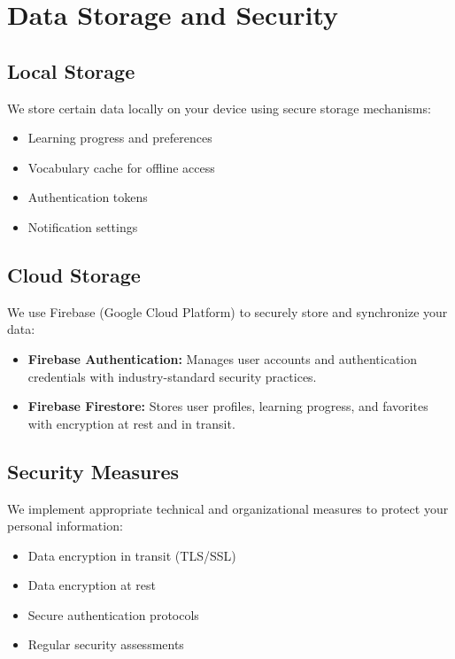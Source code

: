\documentclass[11pt,a4paper]{article}
\begin{document}
\section{Data Storage and Security}

\subsection{Local Storage}

We store certain data locally on your device using secure storage mechanisms:

\begin{itemize}[leftmargin=2em]
    \item Learning progress and preferences
    \item Vocabulary cache for offline access
    \item Authentication tokens
    \item Notification settings
\end{itemize}

\subsection{Cloud Storage}

We use Firebase (Google Cloud Platform) to securely store and synchronize your data:

\begin{itemize}[leftmargin=2em]
    \item \textbf{Firebase Authentication:} Manages user accounts and authentication credentials with industry-standard security practices.
    
    \item \textbf{Firebase Firestore:} Stores user profiles, learning progress, and favorites with encryption at rest and in transit.
\end{itemize}

\subsection{Security Measures}

We implement appropriate technical and organizational measures to protect your personal information:

\begin{itemize}[leftmargin=2em]
    \item Data encryption in transit (TLS/SSL)
    \item Data encryption at rest
    \item Secure authentication protocols
    \item Regular security assessments
\end{itemize}
\end{document}
